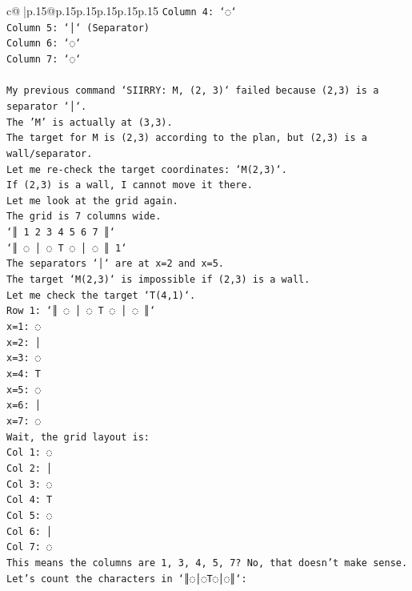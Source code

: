 \documentclass{article}
\begin{document}
{\begin{supertabular}{c@{$\;$}|p{.15\linewidth}@{}p{.15\linewidth}p{.15\linewidth}p{.15\linewidth}p{.15\linewidth}p{.15\linewidth}}
{{{\texttt{Column 4: `◌`} \\
\texttt{Column 5: `│` (Separator)} \\
\texttt{Column 6: `◌`} \\
\texttt{Column 7: `◌`} \\
\\ 
\texttt{My previous command `SIIRRY: M, (2, 3)` failed because (2,3) is a separator `│`.} \\
\texttt{The 'M' is actually at (3,3).} \\
\texttt{The target for M is (2,3) according to the plan, but (2,3) is a wall/separator.} \\
\texttt{Let me re{-}check the target coordinates: `M(2,3)`.} \\
\texttt{If (2,3) is a wall, I cannot move it there.} \\
\texttt{Let me look at the grid again.} \\
\texttt{The grid is 7 columns wide.} \\
\texttt{`║ 1 2 3 4 5 6 7 ║`} \\
\texttt{`║ ◌ │ ◌ T ◌ │ ◌ ║ 1`} \\
\texttt{The separators `│` are at x=2 and x=5.} \\
\texttt{The target `M(2,3)` is impossible if (2,3) is a wall.} \\
\texttt{Let me check the target `T(4,1)`.} \\
\texttt{Row 1: `║ ◌ │ ◌ T ◌ │ ◌ ║`} \\
\texttt{x=1: ◌} \\
\texttt{x=2: │} \\
\texttt{x=3: ◌} \\
\texttt{x=4: T} \\
\texttt{x=5: ◌} \\
\texttt{x=6: │} \\
\texttt{x=7: ◌} \\
\texttt{Wait, the grid layout is:} \\
\texttt{Col 1: ◌} \\
\texttt{Col 2: │} \\
\texttt{Col 3: ◌} \\
\texttt{Col 4: T} \\
\texttt{Col 5: ◌} \\
\texttt{Col 6: │} \\
\texttt{Col 7: ◌} \\
\texttt{This means the columns are 1, 3, 4, 5, 7? No, that doesn't make sense.} \\
\texttt{Let's count the characters in `║◌│◌T◌│◌║`:} \\
}}}
\end{supertabular}}
\end{document}
